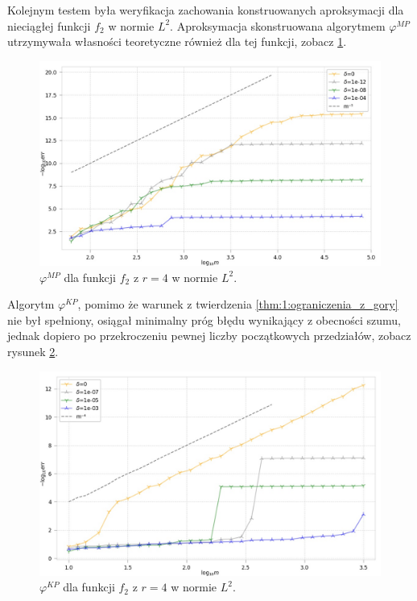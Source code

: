 \documentclass[oik, pdftex, man]{mgrwms}
\begin{document}
    Kolejnym testem była weryfikacja zachowania konstruowanych aproksymacji dla nieciągłej funkcji $f_{2}$ w normie $L^{2}$. Aproksymacja skonstruowana algorytmem $\varphi^{MP}$ utrzymywała własności teoretyczne również dla tej funkcji, zobacz \ref{rys:5}.
    \begin{figure}
        \centering
        \includegraphics[width=.9\linewidth]{alg2015/f_2/r_4/p_2/plot_30evaluation_0.jpg}
        \caption{$\varphi^{MP}$ dla funkcji $f_{2}$ z $r = 4$ w normie $L^{2}$.}
        \label{rys:5}
    \end{figure}

    Algorytm $\varphi^{KP}$, pomimo że warunek z twierdzenia \ref{thm:1:ograniczenia_z_gory} nie był spełniony, osiągał minimalny próg błędu wynikający z obecności szumu, jednak dopiero po przekroczeniu pewnej liczby początkowych przedziałów, zobacz rysunek \ref{rys:6}.
    
    \begin{figure}
        \centering
        \includegraphics[width=.9\linewidth]{alg2014mp/f_2/r_3/p_2/plot_30evaluation_0.jpg}
        \caption{$\varphi^{KP}$ dla funkcji $f_{2}$ z $r = 4$ w normie $L^{2}$.}
        \label{rys:6}
    \end{figure}
\end{document}
